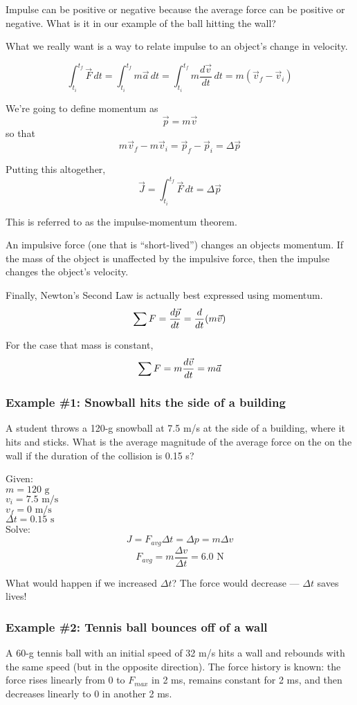 Impulse can be positive or negative because the average force can be positive or negative. What is it in our example of the ball hitting the wall?

What we really want is a way to relate impulse to an object's change in velocity.

$$\displaystyle\int_{t_i}^{t_f}\vec{F}\,dt=\displaystyle\int_{t_i}^{t_f}m\vec{a}\,dt=\displaystyle\int_{t_i}^{t_f}m\frac{d\vec{v}}{dt}\,dt=m(\vec{v}_f-\vec{v}_i)$$

We're going to define momentum as
$$\vec{p}=m\vec{v}$$
so that
$$m\vec v_f-m\vec v_i=\vec p_f-\vec p_i=\Delta{\vec p}$$

Putting this altogether,
$$\boxed{\vec J = \displaystyle\int_{t_i}^{t_f}\vec{F}\,dt = \Delta{\vec p}}$$

This is referred to as the impulse-momentum theorem.

An impulsive force (one that is ``short-lived'') changes an objects momentum. If the mass of the object is unaffected by the impulsive force, then the impulse changes the object's velocity.

Finally, Newton's Second Law is actually best expressed using momentum.
$$\displaystyle \sum F = \frac{d\vec{p}}{dt}=\frac{d}{dt}(m\vec{v})$$

For the case that mass is constant,
$$\displaystyle \sum F = m\frac{d\vec{v}}{dt}=m\vec a$$

\subsubsection{Example \#1: Snowball hits the side of a building}
A student throws a 120-g snowball at 7.5 m/s at the side of a building, where it hits and sticks. What is the average magnitude of the average force on the on the wall if the duration of the collision is 0.15 s?

Given:\\
$m=120\mbox{ g}$\\
$v_i=7.5\mbox{ m/s}$\\
$v_f=0\mbox{ m/s}$\\
$\Delta{t}=0.15\mbox{ s}$\\

Solve:
$$J=F_{avg}\Delta{t}=\Delta{p}=m\Delta{v}$$
$$F_{avg}=m\frac{\Delta{v}}{\Delta{t}}=6.0\mbox{ N}$$

What would happen if we increased $\Delta{t}$? The force would decrease --- $\Delta{t}$ saves lives!

\subsubsection{Example \#2: Tennis ball bounces off of a wall}
A 60-g tennis ball with an initial speed of 32 m/s hits a wall and rebounds with the same speed (but in the opposite direction). The force history is known: the force rises linearly from 0 to $F_{max}$ in 2 ms, remains constant for 2 ms, and then decreases linearly to 0 in another 2 ms.

